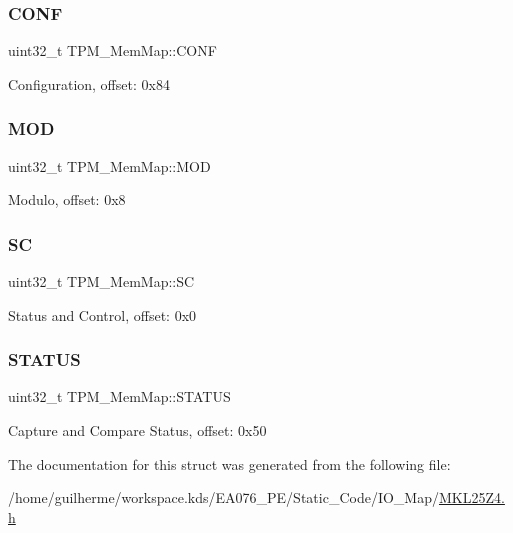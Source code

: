 \subsubsection{\texorpdfstring{C\+O\+NF}{CONF}}
{\footnotesize\ttfamily uint32\+\_\+t T\+P\+M\+\_\+\+Mem\+Map\+::\+C\+O\+NF}

Configuration, offset\+: 0x84 \mbox{\label{struct_t_p_m___mem_map_af46c48b6009bc12f49d484ee9859bcf9}} 
\subsubsection{\texorpdfstring{M\+OD}{MOD}}
{\footnotesize\ttfamily uint32\+\_\+t T\+P\+M\+\_\+\+Mem\+Map\+::\+M\+OD}

Modulo, offset\+: 0x8 \mbox{\label{struct_t_p_m___mem_map_af4ec20dde961637160e35e7ab113d9da}} 
\subsubsection{\texorpdfstring{SC}{SC}}
{\footnotesize\ttfamily uint32\+\_\+t T\+P\+M\+\_\+\+Mem\+Map\+::\+SC}

Status and Control, offset\+: 0x0 \mbox{\label{struct_t_p_m___mem_map_abf85830377235aa5b5d58cc0f86d06b7}} 
\subsubsection{\texorpdfstring{S\+T\+A\+T\+US}{STATUS}}
{\footnotesize\ttfamily uint32\+\_\+t T\+P\+M\+\_\+\+Mem\+Map\+::\+S\+T\+A\+T\+US}

Capture and Compare Status, offset\+: 0x50 

The documentation for this struct was generated from the following file\+:\begin{DoxyCompactItemize}
\item 
/home/guilherme/workspace.\+kds/\+E\+A076\+\_\+\+P\+E/\+Static\+\_\+\+Code/\+I\+O\+\_\+\+Map/\hyperlink{_m_k_l25_z4_8h}{M\+K\+L25\+Z4.\+h}\end{DoxyCompactItemize}
